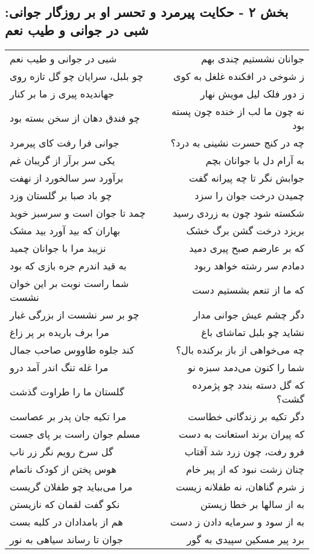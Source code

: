 \begin{center}
\section*{بخش ۲ - حکایت پیرمرد و تحسر او بر روزگار جوانی: شبی در جوانی و طیب نعم}
\label{sec:002}
\begin{longtable}{l p{0.5cm} r}
شبی در جوانی و طیب نعم
&&
جوانان نشستیم چندی بهم
\\
چو بلبل، سرایان چو گل تازه روی
&&
ز شوخی در افکنده غلغل به کوی
\\
جهاندیده پیری ز ما بر کنار
&&
ز دور فلک لیل مویش نهار
\\
چو فندق دهان از سخن بسته بود
&&
نه چون ما لب از خنده چون پسته بود
\\
جوانی فرا رفت کای پیرمرد
&&
چه در کنج حسرت نشینی به درد؟
\\
یکی سر برآر از گریبان غم
&&
به آرام دل با جوانان بچم
\\
برآورد سر سالخورد از نهفت
&&
جوابش نگر تا چه پیرانه گفت
\\
چو باد صبا بر گلستان وزد
&&
چمیدن درخت جوان را سزد
\\
چمد تا جوان است و سرسبز خوید
&&
شکسته شود چون به زردی رسید
\\
بهاران که بید آورد بید مشک
&&
بریزد درخت گشن برگ خشک
\\
نزیبد مرا با جوانان چمید
&&
که بر عارضم صبح پیری دمید
\\
به قید اندرم جره بازی که بود
&&
دمادم سر رشته خواهد ربود
\\
شما راست نوبت بر این خوان نشست
&&
که ما از تنعم بشستیم دست
\\
چو بر سر نشست از بزرگی غبار
&&
دگر چشم عیش جوانی مدار
\\
مرا برف باریده بر پر زاغ
&&
نشاید چو بلبل تماشای باغ
\\
کند جلوه طاووس صاحب جمال
&&
چه می‌خواهی از باز برکنده بال؟
\\
مرا غله تنگ اندر آمد درو
&&
شما را کنون می‌دمد سبزه نو
\\
گلستان ما را طراوت گذشت
&&
که گل دسته بندد چو پژمرده گشت؟
\\
مرا تکیه جان پدر بر عصاست
&&
دگر تکیه بر زندگانی خطاست
\\
مسلم جوان راست بر پای جست
&&
که پیران برند استعانت به دست
\\
گل سرخ رویم نگر زر ناب
&&
فرو رفت، چون زرد شد آفتاب
\\
هوس پختن از کودک ناتمام
&&
چنان زشت نبود که از پیر خام
\\
مرا می‌بباید چو طفلان گریست
&&
ز شرم گناهان، نه طفلانه زیست
\\
نکو گفت لقمان که نازیستن
&&
به از سالها بر خطا زیستن
\\
هم از بامدادان در کلبه بست
&&
به از سود و سرمایه دادن ز دست
\\
جوان تا رساند سیاهی به نور
&&
برد پیر مسکین سپیدی به گور
\\
\end{longtable}
\end{center}
